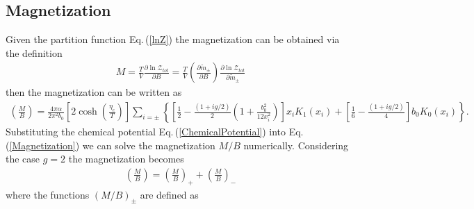 \documentclass[Universe,article,submit,moreauthors,pdftex]{Definitions/mdpi}
\newcommand{\req}[1]{Eq.\,(\ref{#1})}
\begin{document}
\subsection{Magnetization}\label{subsec:Magnetization}
Given the partition function \req{lnZ} the magnetization can be obtained via the definition
\begin{align}
M=\frac{T}{V}\frac{\partial \ln\mathcal{Z}_{tot}}{\partial B}=\frac{T}{V}\left(\frac{\partial\tilde m_\pm}{\partial B}\right)\frac{\partial \ln\mathcal{Z}_{tot}}{\partial\tilde m_\pm}
\end{align}
then the magnetization can be written as
\begin{align}\label{Magnetization}
\left(\frac{M}{B}\right)=\frac{4\pi\alpha}{2\pi^2b_0}\left[2\cosh\left(\frac{\eta_{e}}{T}\right)\right]\sum_{i=\pm}\left\{\left[\frac{1}{2}-\frac{(1+i g/2)}{2}\left(1+\frac{b^2_0}{12x^2_i}\right)\right]x_i K_1(x_i)+\left[\frac{1}{6}-\frac{(1+ig/2)}{4}\right]b_0K_0(x_i)\right\}.
\end{align}
Substituting the chemical potential \req{ChemicalPotential} into \req{Magnetization} we can solve the magnetization $M/B$ numerically.
Considering the case $g=2$ the magnetization becomes
\begin{align}
\left(\frac{M}{B}\right)=\left(\frac{M}{B}\right)_++\left(\frac{M}{B}\right)
_-
\end{align}
where the functions $(M/B)_\pm$ are defined as 
\end{document}
